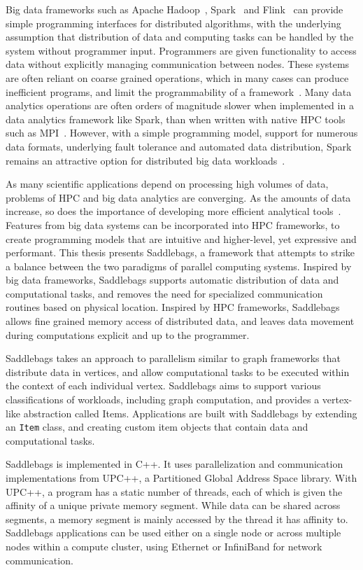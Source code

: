 \documentclass{uit-report}
\begin{document}
Big data frameworks such as Apache Hadoop~\cite{hadoop}, Spark~\cite{spark} and Flink~\cite{flink} can provide simple programming interfaces for distributed algorithms, with the underlying assumption that distribution of data and computing tasks can be handled by the system without programmer input. Programmers are given functionality to access data without explicitly managing communication between nodes. These systems are often reliant on coarse grained operations, which in many cases can produce inefficient programs, and limit the programmability of a framework~\cite{husky, piccolo}. Many data analytics operations are often orders of magnitude slower when implemented in a data analytics framework like Spark, than when written with native HPC tools such as MPI~\cite{bridgingthegap}. However, with a simple programming model, support for numerous data formats, underlying fault tolerance and automated data distribution, Spark remains an attractive option for distributed big data workloads~\cite{sparkarticle}. 

As many scientific applications depend on processing high volumes of data, problems of HPC and big data analytics are converging. As the amounts of data increase, so does the importance of developing more efficient analytical tools~\cite{hpcabds}. Features from big data systems can be incorporated into HPC frameworks, to create programming models that are intuitive and higher-level, yet expressive and performant. This thesis presents Saddlebags, a framework that attempts to strike a balance between the two paradigms of parallel computing systems. Inspired by big data frameworks, Saddlebags supports automatic distribution of data and computational tasks, and removes the need for specialized communication routines based on physical location. Inspired by HPC frameworks, Saddlebags allows fine grained memory access of distributed data, and leaves data movement during computations explicit and up to the programmer.

Saddlebags takes an approach to parallelism similar to graph frameworks \cite{pregel, giraph} that distribute data in vertices, and allow computational tasks to be executed within the context of each individual vertex. Saddlebags aims to support various classifications of workloads, including graph computation, and provides a vertex-like abstraction called Items. Applications are built with Saddlebags by extending an \texttt{Item} class, and creating custom item objects that contain data and computational tasks.

Saddlebags is implemented in C++. It uses parallelization and communication implementations from UPC++, a Partitioned Global Address Space library. With UPC++, a program has a static number of threads, each of which is given the affinity of a unique private memory segment. While data can be shared across segments, a memory segment is mainly accessed by the thread it has affinity to. Saddlebags applications can be used either on a single node or across multiple nodes within a compute cluster, using Ethernet or InfiniBand for network communication.
\end{document}
